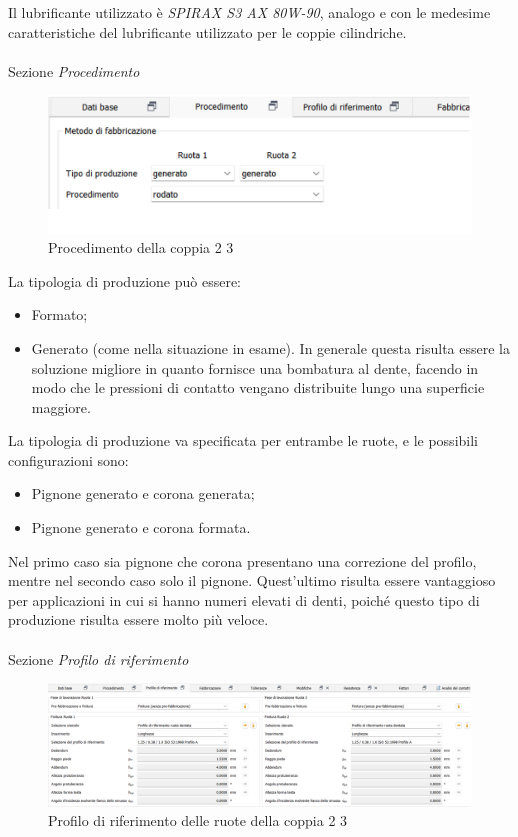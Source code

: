 Il lubrificante utilizzato è \textit{SPIRAX S3 AX 80W-90}, analogo e con le medesime caratteristiche del lubrificante utilizzato per le coppie cilindriche. \\
\\
Sezione \emph{Procedimento}
\begin{figure}[h]
    \centering
    \includegraphics[scale=0.6]{Immagini/ProcedimentoCoppia23.png}
    \caption{Procedimento della coppia 2 3}
    \label{fig:ProcedimentoCoppia23}
\end{figure}

La tipologia di produzione può essere:
\begin{itemize}
    \item Formato;
    \item Generato (come nella situazione in esame). In generale questa risulta essere la soluzione migliore in quanto fornisce una bombatura al dente, facendo in modo che le pressioni di contatto vengano distribuite lungo una superficie maggiore. 
\end{itemize}

La tipologia di produzione va specificata per entrambe le ruote, e le possibili configurazioni sono:
\begin{itemize}
    \item Pignone generato e corona generata;
    \item Pignone generato e corona formata.
\end{itemize}
Nel primo caso sia pignone che corona presentano una correzione del profilo, mentre nel secondo caso solo il pignone. Quest'ultimo risulta essere vantaggioso per applicazioni in cui si hanno numeri elevati di denti, poiché questo tipo di produzione risulta essere molto più veloce. \\
\\
Sezione \emph{Profilo di riferimento}
\begin{figure}[h]
    \centering
    \includegraphics[scale=0.45]{Immagini/ProfiloRiferimentoCoppia23.png}
    \caption{Profilo di riferimento delle ruote della coppia 2 3}
    \label{fig:ProfiloRiferimentoCoppia23}
\end{figure}

